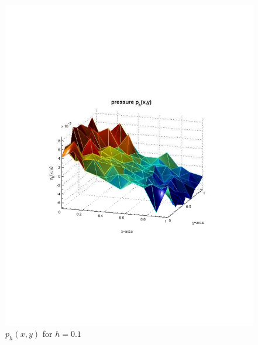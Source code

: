 \documentclass[12pt]{article}
\begin{document}
                \begin{figure}[htb]
                    \begin{center}
                \includegraphics[scale=0.50]{./../files/box/1p.pdf}
                \caption{$p_h(x,y)$ for $h = 0.1$}
            \end{center}
            \end{figure}
\end{document}
